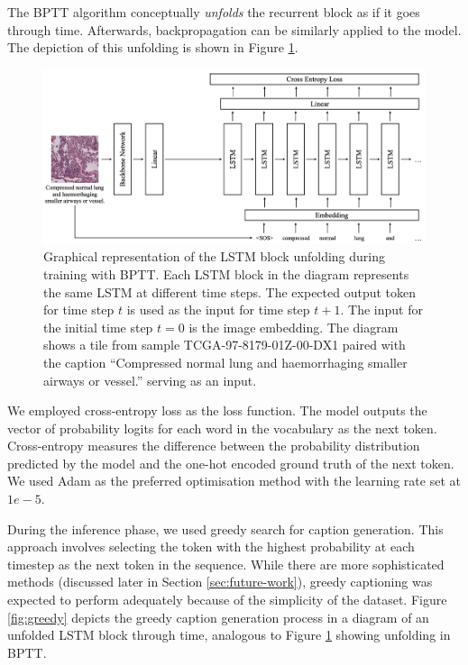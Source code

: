 \documentclass{l4proj}
\begin{document}
The BPTT algorithm conceptually \emph{unfolds} the recurrent block as if it goes through time. Afterwards, backpropagation can be similarly applied to the model. The depiction of this unfolding is shown in Figure \ref{fig:bptt}.

\begin{figure}[t]
    \centering
    \includegraphics[width=1\linewidth]{images/bptt.png}
    \caption{Graphical representation of the LSTM block unfolding during training with BPTT. Each LSTM block in the diagram represents the same LSTM at different time steps. The expected output token for time step $t$ is used as the input for time step $t + 1$. The input for the initial time step $t=0$ is the image embedding. The diagram shows a tile from sample TCGA-97-8179-01Z-00-DX1 paired with the caption ``Compressed normal lung and haemorrhaging smaller airways or vessel.'' serving as an input.}
    \label{fig:bptt}
\end{figure}

We employed cross-entropy loss as the loss function. The model outputs the vector of probability logits for each word in the vocabulary as the next token. Cross-entropy measures the difference between the probability distribution predicted by the model and the one-hot encoded ground truth of the next token. We used Adam as the preferred optimisation method with the learning rate set at $1e-5$. 

During the inference phase, we used greedy search for caption generation. This approach involves selecting the token with the highest probability at each timestep as the next token in the sequence. While there are more sophisticated methods (discussed later in Section \ref{sec:future-work}), greedy captioning was expected to perform adequately because of the simplicity of the dataset. Figure \ref{fig:greedy} depicts the greedy caption generation process in a diagram of an unfolded LSTM block through time, analogous to Figure \ref{fig:bptt} showing unfolding in BPTT.
\end{document}
